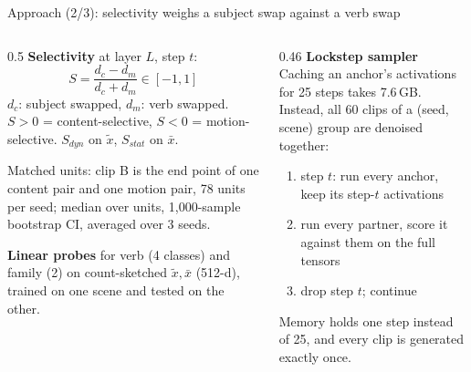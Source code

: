 \documentclass[aspectratio=169,11pt]{beamer}
\newcommand{\xs}{\bar{x}}
\newcommand{\xd}{\tilde{x}}
\begin{document}
\begin{frame}{Approach (2/3): selectivity weighs a subject swap against a verb swap}
  \begin{columns}[T,onlytextwidth]
    \begin{column}{0.5\textwidth}
      \small
      \textbf{Selectivity} at layer $L$, step $t$:
      \[
        S = \frac{d_c - d_m}{d_c + d_m}\in[-1,1]
      \]
      $d_c$: subject swapped, $d_m$: verb swapped. $S>0$ = \textcolor{content}{content-selective},
      $S<0$ = \textcolor{motion}{motion-selective}. $S_{dyn}$ on $\xd$, $S_{stat}$ on $\xs$.

      Matched units: clip B is the end point of one content pair and one motion pair, 78 units
      per seed; median over units, 1{,}000-sample bootstrap CI, averaged over 3 seeds.

      \textbf{Linear probes} for verb (4 classes) and family (2) on count-sketched $\xd,\xs$
      (512-d), trained on one scene and tested on the other.
    \end{column}
    \begin{column}{0.46\textwidth}
      \small
      \textbf{Lockstep sampler}\\
      Caching an anchor's activations for 25 steps takes 7.6\,GB. Instead, all 60 clips of a
      (seed, scene) group are denoised together:
      \begin{enumerate}
        \item step $t$: run every anchor, keep its step-$t$ activations
        \item run every partner, score it against them on the full tensors
        \item drop step $t$; continue
      \end{enumerate}
      Memory holds one step instead of 25, and every clip is generated exactly once.
    \end{column}
  \end{columns}
\end{frame}
\end{document}
